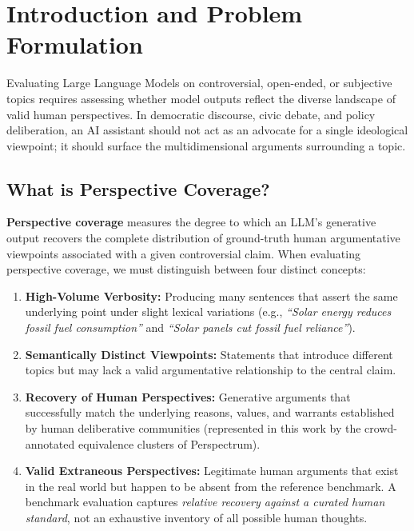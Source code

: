 \documentclass[11pt,a4paper]{article}
\begin{document}
\newpage

\section{Introduction and Problem Formulation}
\label{sec:introduction}

Evaluating Large Language Models on controversial, open-ended, or subjective topics requires assessing whether model outputs reflect the diverse landscape of valid human perspectives. In democratic discourse, civic debate, and policy deliberation, an AI assistant should not act as an advocate for a single ideological viewpoint; it should surface the multidimensional arguments surrounding a topic.

\subsection{What is Perspective Coverage?}
\label{subsec:perspective_coverage_def}
\textbf{Perspective coverage} measures the degree to which an LLM's generative output recovers the complete distribution of ground-truth human argumentative viewpoints associated with a given controversial claim. When evaluating perspective coverage, we must distinguish between four distinct concepts:
\begin{enumerate}[leftmargin=*,itemsep=2pt]
    \item \textbf{High-Volume Verbosity:} Producing many sentences that assert the same underlying point under slight lexical variations (e.g., \textit{``Solar energy reduces fossil fuel consumption''} and \textit{``Solar panels cut fossil fuel reliance''}).
    \item \textbf{Semantically Distinct Viewpoints:} Statements that introduce different topics but may lack a valid argumentative relationship to the central claim.
    \item \textbf{Recovery of Human Perspectives:} Generative arguments that successfully match the underlying reasons, values, and warrants established by human deliberative communities (represented in this work by the crowd-annotated equivalence clusters of Perspectrum).
    \item \textbf{Valid Extraneous Perspectives:} Legitimate human arguments that exist in the real world but happen to be absent from the reference benchmark. A benchmark evaluation captures \textit{relative recovery against a curated human standard}, not an exhaustive inventory of all possible human thoughts.
\end{enumerate}
\end{document}
